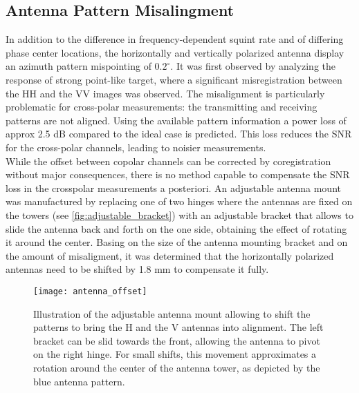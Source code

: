 \subsection{Antenna Pattern Misalingment}\label{sec:methods:misalingment}
In addition to the difference in frequency-dependent squint rate and of differing phase center locations, the horizontally and vertically polarized antenna display an azimuth pattern mispointing of $0.2^\circ$. It was first observed by analyzing the response of strong point-like target, where a significant misregistration between the HH and the VV images was observed. The misalignment is particularly problematic for cross-polar measurements: the transmitting and receiving patterns are not aligned. Using the available pattern information a power loss of approx 2.5 dB  compared to the ideal case is predicted. This loss reduces the SNR for the cross-polar channels, leading to noisier measurements.\\ While the offset between copolar channels can be corrected by coregistration without major consequences, there is no method capable to compensate the SNR loss in the crosspolar measurements a posteriori. An adjustable antenna mount was manufactured by replacing one of two hinges where the antennas are fixed on the towers (see \autoref{fig:adjustable_bracket}) with an adjustable bracket that allows to slide the antenna back and forth on the one side, obtaining the effect of rotating it around the center. Basing on the size of the antenna mounting bracket and on the amount of misaligment, it was determined that the horizontally polarized antennas need to be shifted by 1.8 mm to compensate it fully.
\begin{figure}[ht]
	\centering
	\texttt{[image: antenna\_offset]}
	\caption{Illustration of the adjustable antenna mount allowing to shift the patterns to bring the H and the V antennas into alignment. The left bracket can be slid towards the front, allowing the antenna to pivot on the right hinge. For small shifts, this movement approximates a rotation around the center of the antenna tower, as depicted by the blue antenna pattern.}
	\label{fig:adjustable_bracket}
\end{figure}
